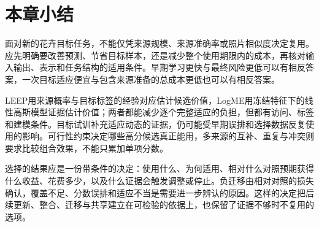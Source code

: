 \FloatBarrier
\section{本章小结}
\label{sec:ket-reuse-summary}

面对新的花卉目标任务，不能仅凭来源规模、来源准确率或照片相似度决定复用。应先明确要改善预测、节省目标样本，还是减少整个使用期限内的成本，再核对输入输出、表示和任务结构的适用条件。早期学习更快与最终风险更低可以有相反答案，一次目标适应便宜与包含来源准备的总成本更低也可以有相反答案。

LEEP用来源概率与目标标签的经验对应估计候选价值，LogME用冻结特征下的线性高斯模型证据估计价值；两者都能减少逐个完整适应的负担，但都有访问、标签和建模条件。目标试训补充适应动态的证据，仍可能受早期误排和选择数据反复使用的影响。可行性约束决定哪些高分候选真正能用，多来源的互补、重复与冲突则要求比较组合效果，不能只累加单项分数。

选择的结果应是一份带条件的决定：使用什么、为何适用、相对什么对照预期获得什么收益、花费多少，以及什么证据会触发调整或停止。负迁移由相对对照的损失确认，覆盖不足、分数误排和适应不当是需要进一步辨认的原因。这样的决定把后续更新、整合、迁移与共享建立在可检验的依据上，也保留了证据不够时不复用的选项。
